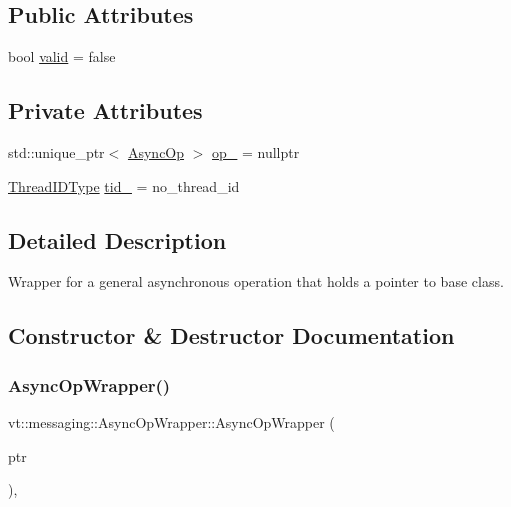 \subsection*{Public Attributes}
\begin{DoxyCompactItemize}
\item 
bool \hyperlink{structvt_1_1messaging_1_1_async_op_wrapper_a040e00648d1bb44428dac609671ef2ae}{valid} = false
\end{DoxyCompactItemize}
\subsection*{Private Attributes}
\begin{DoxyCompactItemize}
\item 
std\+::unique\+\_\+ptr$<$ \hyperlink{structvt_1_1messaging_1_1_async_op}{Async\+Op} $>$ \hyperlink{structvt_1_1messaging_1_1_async_op_wrapper_a9b297f0a0e7852ec34b51937da04fc10}{op\+\_\+} = nullptr
\item 
\hyperlink{namespacevt_a9b887d814dd25ff495a0c8270304ac02}{Thread\+I\+D\+Type} \hyperlink{structvt_1_1messaging_1_1_async_op_wrapper_a92f7ad82efd0a249db46ee7ade6eb7ca}{tid\+\_\+} = no\+\_\+thread\+\_\+id
\end{DoxyCompactItemize}


\subsection{Detailed Description}
Wrapper for a general asynchronous operation that holds a pointer to base class. 



\subsection{Constructor \& Destructor Documentation}
\mbox{\label{structvt_1_1messaging_1_1_async_op_wrapper_a06c7dd199e7b2c252e23c8d81950feed}} 
\subsubsection{\texorpdfstring{Async\+Op\+Wrapper()}{AsyncOpWrapper()}\hspace{0.1cm}{\footnotesize\ttfamily [1/2]}}
{\footnotesize\ttfamily vt\+::messaging\+::\+Async\+Op\+Wrapper\+::\+Async\+Op\+Wrapper (\begin{DoxyParamCaption}\item[{std\+::unique\+\_\+ptr$<$ \hyperlink{structvt_1_1messaging_1_1_async_op}{Async\+Op} $>$}]{ptr }\end{DoxyParamCaption})\hspace{0.3cm}{\ttfamily [inline]}, {\ttfamily [explicit]}}



